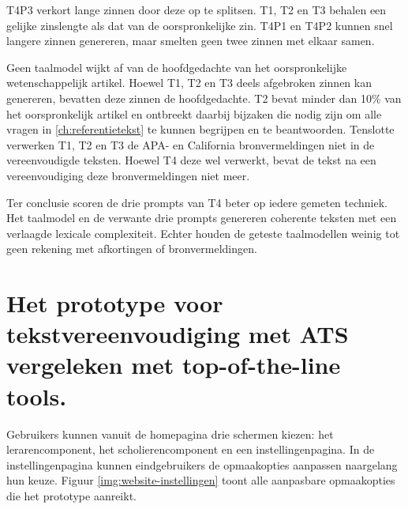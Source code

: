 \medspace

T4P3 verkort lange zinnen door deze op te splitsen. T1, T2 en T3 behalen een gelijke zinslengte als dat van de oorspronkelijke zin. T4P1 en T4P2 kunnen snel langere zinnen genereren, maar smelten geen twee zinnen met elkaar samen.

\medspace

Geen taalmodel wijkt af van de hoofdgedachte van het oorspronkelijke wetenschappelijk artikel. Hoewel T1, T2 en T3 deels afgebroken zinnen kan genereren, bevatten deze zinnen de hoofdgedachte. T2 bevat minder dan 10\% van het oorspronkelijk artikel en ontbreekt daarbij bijzaken die nodig zijn om alle vragen in \ref{ch:referentietekst} te kunnen begrijpen en te beantwoorden. Tenslotte verwerken T1, T2 en T3 de APA- en California bronvermeldingen niet in de vereenvoudigde teksten. Hoewel T4 deze wel verwerkt, bevat de tekst na een vereenvoudiging deze bronvermeldingen niet meer.

\medspace

Ter conclusie scoren de drie prompts van T4 beter op iedere gemeten techniek. Het taalmodel en de verwante drie prompts genereren coherente teksten met een verlaagde lexicale complexiteit. Echter houden de geteste taalmodellen weinig tot geen rekening met afkortingen of bronvermeldingen.

\section{Het prototype voor tekstvereenvoudiging met ATS vergeleken met top-of-the-line tools.}


Gebruikers kunnen vanuit de homepagina drie schermen kiezen: het lerarencomponent, het scholierencomponent en een instellingenpagina. In de instellingenpagina kunnen eindgebruikers de opmaakopties aanpassen naargelang hun keuze. Figuur \ref{img:website-instellingen} toont alle aanpasbare opmaakopties die het prototype aanreikt.

